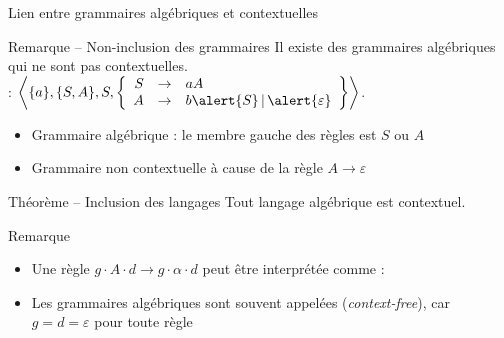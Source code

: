 
\begingroup

\begin{frame}{Lien entre grammaires algébriques et contextuelles}

  \begin{block}{Remarque -- Non-inclusion des grammaires}
    Il existe des grammaires algébriques qui ne sont pas contextuelles. \\
     : $\left\langle \{a\}, \{S, A\}, S, \left\{\begin{array}{rcl} S &\rightarrow & aA \\ A &\rightarrow & b\alert{S} \,|\, \alert{\varepsilon} \end{array}\right\} \right\rangle$.
    \begin{itemize}
    \item Grammaire algébrique : le membre gauche des règles est $S$ ou $A$
    \item Grammaire non contextuelle à cause de la règle $A \rightarrow \varepsilon$
    \end{itemize}
  \end{block}

  \begin{block}{Théorème -- Inclusion des langages}
    Tout langage algébrique est contextuel.
  \end{block}
  
  \begin{block}{Remarque}
    \begin{itemize}
    \item Une règle $g \cdot A \cdot d \rightarrow g \cdot \alpha \cdot d$ peut être interprétée comme :\\ \og {} \fg
    \item Les grammaires algébriques sont souvent appelées  (\textit{context-free}), car $g = d = \varepsilon$ pour toute règle
    \end{itemize}
  \end{block}
  
\end{frame}

\endgroup
\endinput
